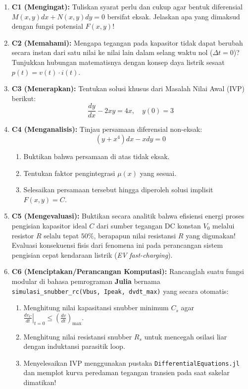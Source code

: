 \documentclass[11pt,a4paper]{article}
\theoremstyle{definition}
\begin{document}
\begin{enumerate}[leftmargin=*]
    \item \textbf{C1 (Mengingat):} 
    Tuliskan syarat perlu dan cukup agar bentuk diferensial $M(x,y)dx + N(x,y)dy = 0$ bersifat eksak. Jelaskan apa yang dimaksud dengan fungsi potensial $F(x,y)$!
    
    \item \textbf{C2 (Memahami):}
    Mengapa tegangan pada kapasitor tidak dapat berubah secara instan dari satu nilai ke nilai lain dalam selang waktu nol ($\Delta t = 0$)? Tunjukkan hubungan matematisnya dengan konsep daya listrik sesaat $p(t) = v(t) \cdot i(t)$.
    
    \item \textbf{C3 (Menerapkan):}
    Tentukan solusi khusus dari Masalah Nilai Awal (IVP) berikut:
    \begin{equation}
        \frac{dy}{dx} - 2x y = 4x, \quad y(0) = 3
    \end{equation}
    
    \item \textbf{C4 (Menganalisis):}
    Tinjau persamaan diferensial non-eksak:
    \begin{equation}
        (y + x^4) dx - x dy = 0
    \end{equation}
    \begin{enumerate}
        \item Buktikan bahwa persamaan di atas tidak eksak.
        \item Tentukan faktor pengintegrasi $\mu(x)$ yang sesuai.
        \item Selesaikan persamaan tersebut hingga diperoleh solusi implisit $F(x,y) = C$.
    \end{enumerate}
    
    \item \textbf{C5 (Mengevaluasi):}
    Buktikan secara analitik bahwa efisiensi energi proses pengisian kapasitor ideal $C$ dari sumber tegangan DC konstan $V_0$ melalui resistor $R$ selalu tepat $50\%$, berapapun nilai resistansi $R$ yang digunakan! Evaluasi konsekuensi fisis dari fenomena ini pada perancangan sistem pengisian cepat kendaraan listrik (\textit{EV fast-charging}).
    
    \item \textbf{C6 (Menciptakan/Perancangan Komputasi):}
    Rancanglah suatu fungsi modular di bahasa pemrograman \textbf{Julia} bernama \texttt{simulasi\_snubber\_rc(Vbus, Ipeak, dvdt\_max)} yang secara otomatis:
    \begin{enumerate}
        \item Menghitung nilai kapasitansi snubber minimum $C_s$ agar $\left. \frac{dv_C}{dt} \right|_{t=0} \le \left(\frac{dv}{dt}\right)_{\text{max}}$.
        \item Menghitung nilai resistansi snubber $R_s$ untuk mencegah osilasi liar dengan induktansi parasitik loop.
        \item Menyelesaikan IVP menggunakan pustaka \texttt{DifferentialEquations.jl} dan memplot kurva peredaman tegangan transien pada saat sakelar dimatikan!
    \end{enumerate}
\end{enumerate}
\end{document}
